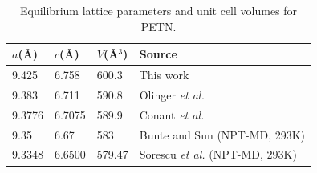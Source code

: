 \documentclass[prb,aps,nobibnotes,twocolumn,doublespace,twocolumngrid,superbib]{revtex4}
\begin{document}
\begin{table}[p]
\begin{center}
\begin{tabular}{llll}
\hline\hline
$a$(\AA) & $c$(\AA) & $V$(\AA$^3$) & Source \\
\hline
9.425  & 6.758  &  600.3  & This work \\
9.383  & 6.711  &  590.8  & Olinger {\it et al.}\cite{Olinger_1975v62}\\
9.3776 & 6.7075 &  589.9  & Conant {\it et al.}\cite{Conant_1979} \\
9.35   & 6.67   &  583    & Bunte and Sun\cite{Bunte_2000v104} (NPT-MD, 293K) \\
9.3348 & 6.6500 &  579.47 & Sorescu {\it et al.}\cite{Sorescu_1999v103} (NPT-MD, 293K) \\
\hline\hline
\end{tabular}
\end{center}
\caption{Equilibrium lattice parameters and unit cell volumes for PETN.
}
\label{tab:table1}
\end{table}
\end{document}
